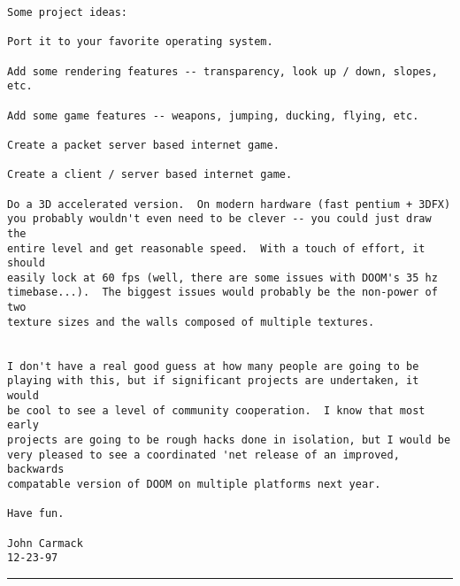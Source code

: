 \begin{verbatim}
Some project ideas:

Port it to your favorite operating system.

Add some rendering features -- transparency, look up / down, slopes,
etc.

Add some game features -- weapons, jumping, ducking, flying, etc.

Create a packet server based internet game.

Create a client / server based internet game.

Do a 3D accelerated version.  On modern hardware (fast pentium + 3DFX)
you probably wouldn't even need to be clever -- you could just draw the
entire level and get reasonable speed.  With a touch of effort, it should
easily lock at 60 fps (well, there are some issues with DOOM's 35 hz
timebase...).  The biggest issues would probably be the non-power of two
texture sizes and the walls composed of multiple textures.


I don't have a real good guess at how many people are going to be
playing with this, but if significant projects are undertaken, it would
be cool to see a level of community cooperation.  I know that most early
projects are going to be rough hacks done in isolation, but I would be
very pleased to see a coordinated 'net release of an improved, backwards
compatable version of DOOM on multiple platforms next year.

Have fun.

John Carmack
12-23-97

\end{verbatim}
\par \hrule
